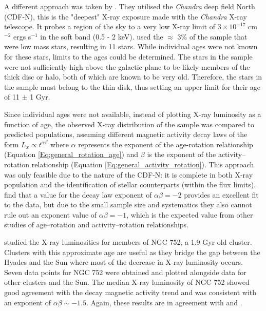 A different approach was taken by \citet{Feigelson_etal_2004}. They utilised the \textit{Chandra} deep field North (CDF-N), this is the "deepest" X-ray exposure made with the \textit{Chandra} X-ray telescope. It probes a region of the sky to a very low X-ray limit of $3 \times 10^{-17}$ cm$^{-2}$ ergs s$^{-1}$ in the soft band (0.5 - 2 keV). \citet{Feigelson_etal_2004} used the $\approx$ 3\% of the sample that were low mass stars, resulting in 11 stars. While individual ages were not known for these stars, limits to the ages could be determined. The stars in the sample were not sufficiently high above the galactic plane to be likely members of the thick disc or halo, both of which are known to be very old. Therefore, the stars in the sample must belong to the thin disk, thus setting an upper limit for their age of 11 $\pm$ 1 Gyr.

Since individual ages were not available, instead of plotting X-ray luminosity as a function of age, the observed X-ray distribution of the sample was compared to predicted populations, assuming different magnetic activity decay laws of the form $L_{x} \propto t^{\alpha\beta}$ where $\alpha$ represents the exponent of the age-rotation relationship (Equation \ref{Eq:general_rotation_age}) and $\beta$ is the exponent of the activity--rotation relationship (Equation \ref{Eq:general_activity_rotation}). This approach was only feasible due to the nature of the CDF-N: it is complete in both X-ray population and the identification of stellar counterparts (within the flux limits). \citet{Feigelson_etal_2004} find that a value for the decay law exponent of $\alpha\beta = -2$ provides an excellent fit to the data, but due to the small sample size and systematics they also cannot rule out an exponent value of $\alpha\beta = -1$, which is the expected value from other studies of age--rotation and activity--rotation relationships.

\citet{Giardino_etal_2008} studied the X-ray luminosities for members of NGC 752, a 1.9 Gyr old cluster. Clusters with this approximate age are useful as they bridge the gap between the Hyades and the Sun where most of the decrease in X-ray luminosity occurs. Seven data points for NGC 752 were obtained and plotted alongside data for other clusters and the Sun. The median X-ray luminosity of NGC 752 showed good agreement with the decay magnetic activity trend and was consistent with an exponent of $\alpha\beta \sim -1.5$. Again, these results are in agreement with \citet{Maggio_etal_1987} and \citet{Feigelson_etal_2004}.

